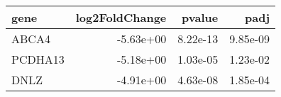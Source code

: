 \begin{tabular}{lrrr}
\toprule
   gene &  log2FoldChange &   pvalue &     padj \\
\midrule
  ABCA4 &       -5.63e+00 & 8.22e-13 & 9.85e-09 \\
PCDHA13 &       -5.18e+00 & 1.03e-05 & 1.23e-02 \\
   DNLZ &       -4.91e+00 & 4.63e-08 & 1.85e-04 \\
\bottomrule
\end{tabular}
